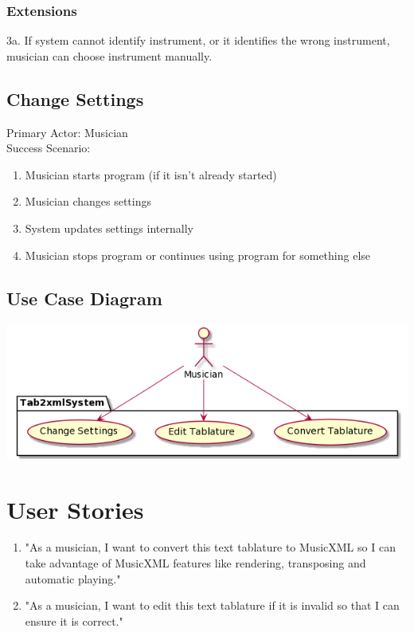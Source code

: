 \documentclass[11pt]{article}
\begin{document}
\subsubsection{Extensions}
\label{sec:org0cf5af7}
3a. If system cannot identify instrument, or it identifies the wrong instrument, musician can choose instrument manually. \\
\subsection{Change Settings}
\label{sec:orgdd9f711}
Primary Actor: Musician \\
Success Scenario:
\begin{enumerate}
\item Musician starts program (if it isn't already started)
\item Musician changes settings
\item System updates settings internally
\item Musician stops program or continues using program for something else
\end{enumerate}
\subsection{Use Case Diagram}
\label{sec:orgde57433}
\begin{center}
\includegraphics[width=.9\linewidth]{./Diagrams/use-case-diagram.png}
\end{center}
\section{User Stories}
\label{sec:orgd02b517}
\begin{enumerate}
\item "As a musician, I want to convert this text tablature to MusicXML so I can take advantage of MusicXML features like rendering, transposing and automatic playing."
\item "As a musician, I want to edit this text tablature if it is invalid so that I can ensure it is correct."
\end{enumerate}
\end{document}
